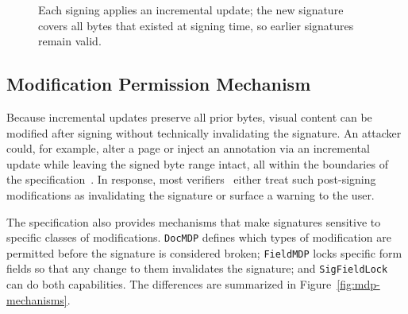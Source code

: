 \documentclass[12pt]{article}
\begin{document}
\begin{figure}[H]
    \caption{Each signing applies an incremental update; the new signature covers all bytes that existed at signing time, so earlier signatures remain valid.\label{fig:multiple-signatures}}
\end{figure}

\subsection{Modification Permission Mechanism} \label{sec:doc-mod-perm}


Because incremental updates preserve all prior bytes, visual content can be modified after signing without technically invalidating the signature. An attacker could, for example, alter a page or inject an annotation via an incremental update while leaving the signed byte range intact, all within the boundaries of the specification~\cite{iso32000-2}. In response, most verifiers~\cite{adobereader,foxitreader,libreoffice} either treat such post-signing modifications as invalidating the signature or surface a warning to the user.

The specification also provides mechanisms that make signatures sensitive to specific classes of modifications. \texttt{DocMDP} defines which types of modification are permitted before the signature is considered broken; \texttt{FieldMDP} locks specific form fields so that any change to them invalidates the signature; and \texttt{SigFieldLock} can do both capabilities. The differences are summarized in Figure~\ref{fig:mdp-mechanisms}.
\end{document}
